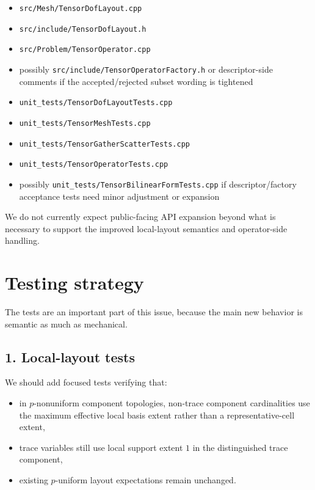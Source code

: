\documentclass[11pt]{article}
\begin{document}
\begin{itemize}[leftmargin=*]
  \item \texttt{src/Mesh/TensorDofLayout.cpp}
  \item \texttt{src/include/TensorDofLayout.h}
  \item \texttt{src/Problem/TensorOperator.cpp}
  \item possibly \texttt{src/include/TensorOperatorFactory.h} or descriptor-side comments if the accepted/rejected subset wording is tightened
  \item \texttt{unit\_tests/TensorDofLayoutTests.cpp}
  \item \texttt{unit\_tests/TensorMeshTests.cpp}
  \item \texttt{unit\_tests/TensorGatherScatterTests.cpp}
  \item \texttt{unit\_tests/TensorOperatorTests.cpp}
  \item possibly \texttt{unit\_tests/TensorBilinearFormTests.cpp} if descriptor/factory acceptance tests need minor adjustment or expansion
\end{itemize}

We do not currently expect public-facing API expansion beyond what is necessary to support the improved local-layout semantics and operator-side handling.

\section{Testing strategy}

The tests are an important part of this issue, because the main new behavior is semantic as much as mechanical.

\subsection{1. Local-layout tests}

We should add focused tests verifying that:
\begin{itemize}[leftmargin=*]
  \item in \(p\)-nonuniform component topologies, non-trace component cardinalities use the maximum effective local basis extent rather than a representative-cell extent,
  \item trace variables still use local support extent \(1\) in the distinguished trace component,
  \item existing \(p\)-uniform layout expectations remain unchanged.
\end{itemize}
\end{document}
